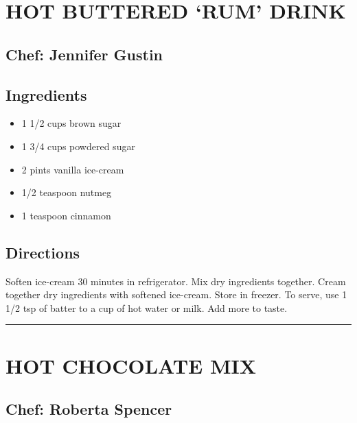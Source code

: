 \documentclass[
]{book}
\providecommand{\tightlist}{%
  \setlength{\itemsep}{0pt}\setlength{\parskip}{0pt}}
\begin{document}
\hypertarget{hot-buttered-rum-drink}{%
\section*{HOT BUTTERED `RUM' DRINK}\label{hot-buttered-rum-drink}}


\hypertarget{chef-jennifer-gustin-1}{%
\subsection*{Chef: Jennifer Gustin}\label{chef-jennifer-gustin-1}}


\hypertarget{ingredients-6}{%
\subsection*{Ingredients}\label{ingredients-6}}


\begin{itemize}
\tightlist
\item
  1 1/2 cups brown sugar
\item
  1 3/4 cups powdered sugar
\item
  2 pints vanilla ice-cream
\item
  1/2 teaspoon nutmeg
\item
  1 teaspoon cinnamon
\end{itemize}

\hypertarget{directions-6}{%
\subsection*{Directions}\label{directions-6}}


Soften ice-cream 30 minutes in refrigerator. Mix dry ingredients together.
Cream together dry ingredients with softened ice-cream.
Store in freezer. To serve, use 1 1/2 tsp of batter to a cup of hot water or milk. Add more to taste.

\begin{center}\rule{0.5\linewidth}{0.5pt}\end{center}

\hypertarget{hot-chocolate-mix}{%
\section*{HOT CHOCOLATE MIX}\label{hot-chocolate-mix}}


\hypertarget{chef-roberta-spencer}{%
\subsection*{Chef: Roberta Spencer}\label{chef-roberta-spencer}}
\end{document}
